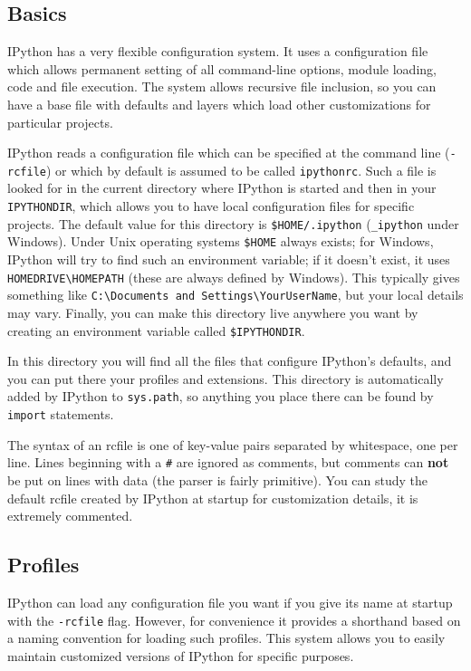 \subsection{Basics}

IPython has a very flexible configuration system. It uses a configuration
file which allows permanent setting of all command-line options, module
loading, code and file execution. The system allows recursive file
inclusion, so you can have a base file with defaults and layers which
load other customizations for particular projects.

IPython reads a configuration file which can be specified at the command
line (\texttt{-rcfile}) or which by default is assumed to be called
\texttt{ipythonrc}. Such a file is looked for in the current directory
where IPython is started and then in your \texttt{IPYTHONDIR}, which
allows you to have local configuration files for specific projects.
The default value for this directory is \texttt{\$HOME/.ipython} (\texttt{\_ipython}
under Windows). Under Unix operating systems \texttt{\$HOME} always
exists; for Windows, IPython will try to find such an environment
variable; if it doesn't exist, it uses \texttt{HOMEDRIVE\textbackslash{}HOMEPATH}
(these are always defined by Windows). This typically gives something
like \texttt{C:\textbackslash{}Documents and Settings\textbackslash{}YourUserName},
but your local details may vary. Finally, you can make this directory
live anywhere you want by creating an environment variable called
\texttt{\$IPYTHONDIR}.

In this directory you will find all the files that configure IPython's
defaults, and you can put there your profiles and extensions. This
directory is automatically added by IPython to \texttt{sys.path},
so anything you place there can be found by \texttt{import} statements.

The syntax of an rcfile is one of key-value pairs separated by whitespace,
one per line. Lines beginning with a \texttt{\#} are ignored as comments,
but comments can \textbf{not} be put on lines with data (the parser
is fairly primitive). You can study the default rcfile created by
IPython at startup for customization details, it is extremely commented.


\subsection{Profiles}

IPython can load any configuration file you want if you give its name
at startup with the \texttt{-rcfile} flag. However, for convenience
it provides a shorthand based on a naming convention for loading such
profiles. This system allows you to easily maintain customized versions
of IPython for specific purposes.

